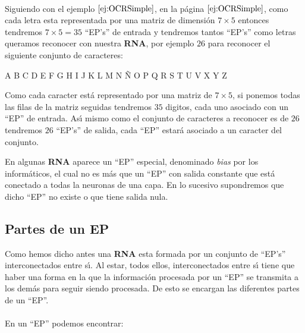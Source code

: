 \begin{ejemplo}\ \\
Siguiendo con el ejemplo $\ref{ej:OCRSimple}$, en la p\'agina
$\pageref{ej:OCRSimple}$, como cada letra esta representada por una matriz de
dimensi\'on $7\times 5$ entonces tendremos $7\times 5 = 35$ ``EP's'' de entrada
y tendremos tantos ``EP's'' como letras queramos reconocer con nuestra
\textbf{RNA}, por ejemplo $26$ para reconocer el siguiente conjunto de
caracteres:
\begin{center}
A B C D E F G H I J K L M N \~N O P Q R S T U V X Y Z
\end{center}
Como cada caracter est\'a representado por una matriz de $7\times 5$, si
ponemos todas las filas de la matriz seguidas tendremos $35$ digitos, cada uno
asociado con un ``EP'' de entrada. As\'{\i} mismo como el conjunto de
caracteres a reconocer es de $26$ tendremos $26$ ``EP's'' de salida, cada
``EP'' estar\'a asociado a un caracter del conjunto.
\end{ejemplo}

En algunas \textbf{RNA} aparece un ``EP'' especial, denominado \emph{bias} por
los inform\'aticos, el cual no es m\'as que un ``EP'' con salida constante que
est\'a conectado a todas la neuronas de una capa. En lo sucesivo supondremos que
dicho ``EP'' no existe o que tiene salida nula.
%
\newpage
%
\subsection{Partes de un EP}

Como hemos dicho antes una \textbf{RNA} esta formada por un conjunto de
``EP's'' interconectados entre s\'{\i}. Al estar, todos ellos, interconectados
entre s\'{\i} tiene que haber una forma en la que la informaci\'on procesada
por un ``EP'' se transmita a los dem\'as para seguir siendo procesada. De esto
se encargan las diferentes partes de un ``EP''.\\ \\
En un ``EP'' podemos encontrar:

